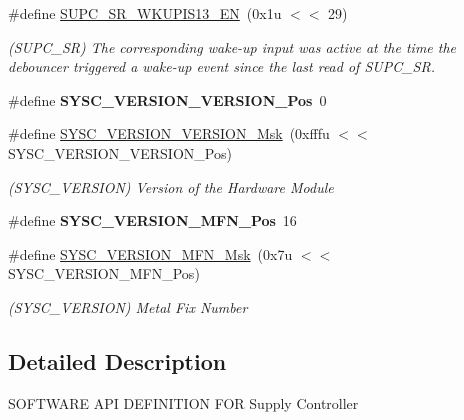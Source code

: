 \begin{DoxyCompactItemize}
\#define \mbox{\hyperlink{group__SAMV71__SUPC_gaec34ff09f82b720754bd86d17b184972}{S\+U\+P\+C\+\_\+\+S\+R\+\_\+\+W\+K\+U\+P\+I\+S13\+\_\+\+EN}}~(0x1u $<$$<$ 29)
\begin{DoxyCompactList}\small\item\em (S\+U\+P\+C\+\_\+\+SR) The corresponding wake-\/up input was active at the time the debouncer triggered a wake-\/up event since the last read of S\+U\+P\+C\+\_\+\+SR. \end{DoxyCompactList}\item 
\mbox{\label{group__SAMV71__SUPC_ga62b3e64db991689be4e19e40e542b08c}} 
\#define {\bfseries S\+Y\+S\+C\+\_\+\+V\+E\+R\+S\+I\+O\+N\+\_\+\+V\+E\+R\+S\+I\+O\+N\+\_\+\+Pos}~0
\item 
\mbox{\label{group__SAMV71__SUPC_ga02d03dc1bd41c91251461ba4af7d6106}} 
\#define \mbox{\hyperlink{group__SAMV71__SUPC_ga02d03dc1bd41c91251461ba4af7d6106}{S\+Y\+S\+C\+\_\+\+V\+E\+R\+S\+I\+O\+N\+\_\+\+V\+E\+R\+S\+I\+O\+N\+\_\+\+Msk}}~(0xfffu $<$$<$ S\+Y\+S\+C\+\_\+\+V\+E\+R\+S\+I\+O\+N\+\_\+\+V\+E\+R\+S\+I\+O\+N\+\_\+\+Pos)
\begin{DoxyCompactList}\small\item\em (S\+Y\+S\+C\+\_\+\+V\+E\+R\+S\+I\+ON) Version of the Hardware Module \end{DoxyCompactList}\item 
\mbox{\label{group__SAMV71__SUPC_gadd04e6820c9d03f6f41c5e4594ff1795}} 
\#define {\bfseries S\+Y\+S\+C\+\_\+\+V\+E\+R\+S\+I\+O\+N\+\_\+\+M\+F\+N\+\_\+\+Pos}~16
\item 
\mbox{\label{group__SAMV71__SUPC_ga1237f679e239fedcc2e359faf8a463c0}} 
\#define \mbox{\hyperlink{group__SAMV71__SUPC_ga1237f679e239fedcc2e359faf8a463c0}{S\+Y\+S\+C\+\_\+\+V\+E\+R\+S\+I\+O\+N\+\_\+\+M\+F\+N\+\_\+\+Msk}}~(0x7u $<$$<$ S\+Y\+S\+C\+\_\+\+V\+E\+R\+S\+I\+O\+N\+\_\+\+M\+F\+N\+\_\+\+Pos)
\begin{DoxyCompactList}\small\item\em (S\+Y\+S\+C\+\_\+\+V\+E\+R\+S\+I\+ON) Metal Fix Number \end{DoxyCompactList}\end{DoxyCompactItemize}


\subsection{Detailed Description}
S\+O\+F\+T\+W\+A\+RE A\+PI D\+E\+F\+I\+N\+I\+T\+I\+ON F\+OR Supply Controller 